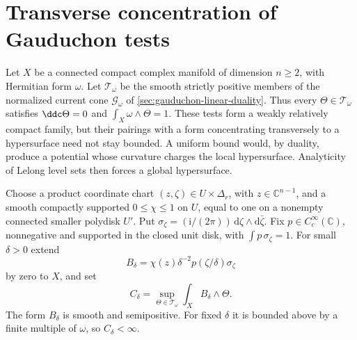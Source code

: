 \section{Transverse concentration of Gauduchon tests}
\label{draft:597-transverse-concentration}

Let $X$ be a connected compact complex manifold of dimension $n\geq2$, with Hermitian form $\omega$. Let $\mathcal T_\omega$ be the smooth strictly positive members of the normalized current cone $\mathscr G_\omega$ of \cref{sec:gauduchon-linear-duality}. Thus every $\Theta\in\mathcal T_\omega$ satisfies $\ddc\Theta=0$ and $\int_X\omega\wedge\Theta=1$.
These tests form a weakly relatively compact family, but their pairings with a form concentrating transversely to a hypersurface need not stay bounded. A uniform bound would, by duality, produce a potential whose curvature charges the local hypersurface. Analyticity of Lelong level sets then forces a global hypersurface.

Choose a product coordinate chart $(z,\zeta)\in U\times\Delta_r$, with $z\in\mathbb C^{n-1}$, and a smooth compactly supported $0\leq\chi\leq1$ on $U$, equal to one on a nonempty connected smaller polydisk $U'$. Put $\sigma_\zeta=(\mathrm i/(2\pi))\,\mathrm d\zeta\wedge\mathrm d\bar\zeta$. Fix $p\in C_c^\infty(\mathbb C)$, nonnegative and supported in the closed unit disk, with $\int p\,\sigma_\zeta=1$. For small $\delta>0$ extend
\[
 B_\delta=\chi(z)\delta^{-2}p(\zeta/\delta)\sigma_\zeta
\]
by zero to $X$, and set
\[
 C_\delta=\sup_{\Theta\in\mathcal T_\omega}
                      \int_XB_\delta\wedge\Theta.
\]
The form $B_\delta$ is smooth and semipositive. For fixed $\delta$ it is bounded above by a finite multiple of $\omega$, so $C_\delta<\infty$.

